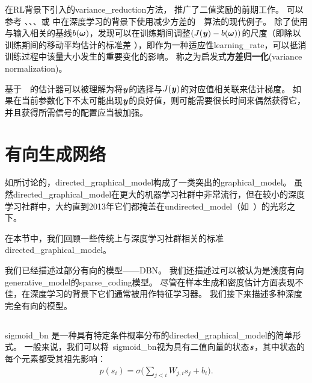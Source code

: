 
在\gls{RL}背景下引入的\gls{variance_reduction}方法\citep{Sutton-et-al-2000,Weaver+Tao-UAI2001}， \citet{Dayan-1990}推广了二值奖励的前期工作。
可以参考 \citet{bengio2013estimating}、\citet{Mnih+Gregor-ICML2014}、\citet{Ba+Mnih-arxiv2014}、\citet{Mnih2014}或 \citet{Xu-et-al-ICML2015} 中在深度学习的背景下使用减少方差的~~算法的现代例子。
除了使用与输入相关的基线$b(\boldsymbol{\omega})$，\citet{Mnih+Gregor-ICML2014}发现可以在训练期间调整$(J(\boldsymbol{\mathit{y}}) - b(\boldsymbol{\omega}))$的尺度（即除以训练期间的移动平均估计的标准差 ），即作为一种适应性\gls{learning_rate}，可以抵消训练过程中该量大小发生的重要变化的影响。
\citet{Mnih+Gregor-ICML2014} 称之为启发式\textbf{方差归一化}(variance normalization)。

基于~~的估计器可以被理解为将$\boldsymbol{\mathit{y}}$的选择与$J(\boldsymbol{\mathit{y}})$的对应值相关联来估计梯度。
如果在当前参数化下不太可能出现$\boldsymbol{\mathit{y}}$的良好值，则可能需要很长时间来偶然获得它，并且获得所需信号的配置应当被加强。

\section{有向生成网络}
\label{sec:directed_generative_nets}

如所讨论的，\gls{directed_graphical_model}构成了一类突出的\gls{graphical_model}。
虽然\gls{directed_graphical_model}在更大的机器学习社群中非常流行，但在较小的深度学习社群中，大约直到2013年它们都掩盖在\gls{undirected_model}（如~）的光彩之下。

在本节中，我们回顾一些传统上与深度学习社群相关的标准\gls{directed_graphical_model}。

我们已经描述过部分有向的模型——\gls{DBN}。
我们还描述过可以被认为是浅度有向\gls{generative_model}的\gls{sparse_coding}模型。
尽管在样本生成和密度估计方面表现不佳，在深度学习的背景下它们通常被用作特征学习器。
我们接下来描述多种深度完全有向的模型。


\subsection{}
\label{ sec:sigmoid _belief_networks}

\gls{sigmoid_bn} \citep{Neal-1990}是一种具有特定条件概率分布的\gls{directed_graphical_model}的简单形式。
一般来说，我们可以将~\gls{sigmoid_bn}视为具有二值向量的状态$\boldsymbol{\mathit{s}}$，其中状态的每个元素都受其祖先影响：
\begin{align}
 p(s_i) = \sigma \Bigg( \sum_{j<i} W_{j,i} s_j + b_i \Bigg).
\end{align}

